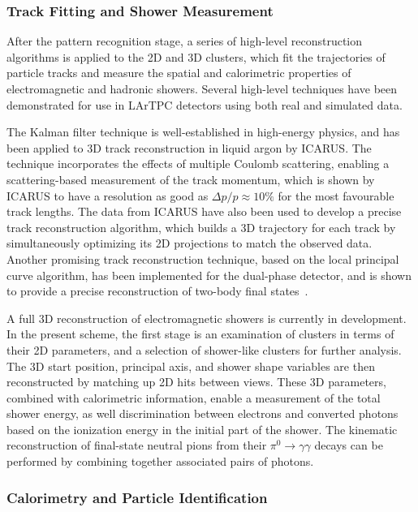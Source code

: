 \subsubsection{Track Fitting and Shower Measurement}

After the pattern recognition stage, a series of high-level
reconstruction algorithms is applied to the 2D and 3D clusters, which
fit the trajectories of particle tracks and measure the spatial and
calorimetric properties of electromagnetic and hadronic showers.
Several high-level techniques have been demonstrated for use in LArTPC
detectors using both real and simulated data.

The Kalman filter technique\cite{kalman} is well-established in
high-energy physics, and has been applied to 3D track reconstruction
in liquid argon by ICARUS\cite{Ankowski:2006ts}.  The technique
incorporates the effects of multiple Coulomb scattering, enabling a
scattering-based measurement of the track momentum, which is shown by
ICARUS to have a resolution as good as $\Delta p/p \approx 10\%$ for
the most favourable track lengths.  The data from ICARUS have also
been used to develop a precise track reconstruction algorithm, which
builds a 3D trajectory for each track by simultaneously optimizing its
2D projections to match the observed data\cite{Antonello:2012hu}.
Another promising track reconstruction technique, based on the local
principal curve algorithm, has been implemented for the dual-phase
detector, and is shown to provide a precise reconstruction of two-body
final states~\cite{Back:2013cva,LAGUNA-LBNO-deliv}.

A full 3D reconstruction of electromagnetic showers is currently in
development.  In the present scheme, the first stage is an examination
of clusters in terms of their 2D parameters, and a selection of
shower-like clusters for further analysis. The 3D start position,
principal axis, and shower shape variables are then reconstructed by
matching up 2D hits between views.  These 3D parameters, combined with
calorimetric information, enable a measurement of the total shower
energy, as well discrimination between electrons and converted photons
based on the ionization energy in the initial part of the shower. The
kinematic reconstruction of final-state neutral pions from their
$\pi^{0} \rightarrow \gamma\gamma$ decays can be performed by
combining together associated pairs of photons.


\subsubsection{Calorimetry and Particle Identification}

